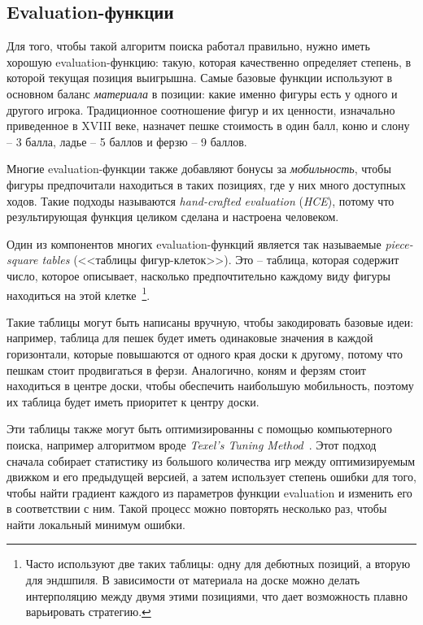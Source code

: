 \documentclass{article}
\begin{document}
\subsection{Evaluation-функции}

Для того, чтобы такой алгоритм поиска работал правильно,
нужно иметь хорошую evaluation-функцию:
такую, которая качественно определяет степень,
в которой текущая позиция выигрышна.
Самые базовые функции используют в основном баланс \emph{материала} в позиции:
какие именно фигуры есть у одного и другого игрока.
Традиционное соотношение фигур и их ценности,
изначально приведенное в XVIII веке,
назначет пешке стоимость в один балл,
коню и слону -- 3 балла,
ладье -- 5 баллов
и ферзю -- 9 баллов.

Многие evaluation-функции также добавляют бонусы за \emph{мобильность},
чтобы фигуры предпочитали находиться в таких позициях,
где у них много доступных ходов.
Такие подходы называются \emph{hand-crafted evaluation} (\emph{HCE}),
потому что результирующая функция целиком сделана и настроена человеком.

Один из компонентов многих evaluation-функций является
так называемые \emph{piece-square tables} (<<таблицы фигур-клеток>>).
Это -- таблица, которая содержит число, которое описывает,
насколько предпочтительно каждому виду фигуры находиться на этой клетке~\footnote{
    Часто используют две таких таблицы: одну для дебютных позиций,
    а вторую для эндшпиля.
    В зависимости от материала на доске
    можно делать интерполяцию между двумя этими позициями,
    что дает возможность плавно варьировать стратегию.
}.

Такие таблицы могут быть написаны вручную,
чтобы закодировать базовые идеи:
например, таблица для пешек будет иметь одинаковые значения в каждой горизонтали,
которые повышаются от одного края доски к другому,
потому что пешкам стоит продвигаться в ферзи.
Аналогично, коням и ферзям стоит находиться в центре доски,
чтобы обеспечить наибольшую мобильность,
поэтому их таблица будет иметь приоритет к центру доски.

Эти таблицы также могут быть оптимизированны с помощью компьютерного поиска,
например алгоритмом вроде \emph{Texel's Tuning Method}~\cite{texel-tuning}.
Этот подход сначала собирает статистику из большого количества игр
между оптимизируемым движком и его предыдущей версией,
а затем использует степень ошибки для того, чтобы найти градиент каждого из параметров функции evaluation
и изменить его в соответствии с ним.
Такой процесс можно повторять несколько раз,
чтобы найти локальный минимум ошибки.
\end{document}
